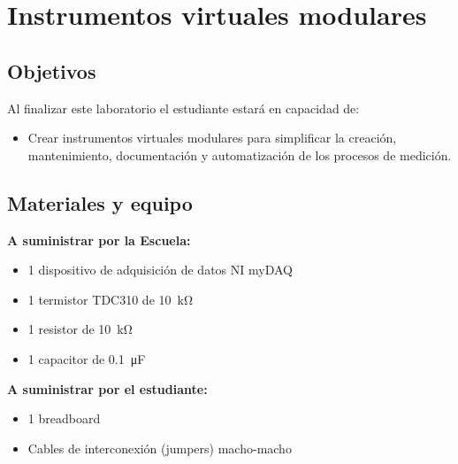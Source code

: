 \documentclass[12pt,letterpaper]{report}
\newcommand{\obj}{Objetivos}
\newcommand{\mat}{Materiales y equipo}
\newcommand{\capacidad}{Al finalizar este laboratorio el estudiante estará en capacidad de:}
\begin{document}
\chapter{Instrumentos virtuales modulares}
\section{\obj}
\capacidad
\begin{itemize}
\item Crear instrumentos virtuales modulares para simplificar la creación, mantenimiento, documentación y automatización de los procesos de medición.
\end{itemize}

\section{\mat}
\textbf{A suministrar por la Escuela:}
\begin{itemize}
\item 1 dispositivo de adquisición de datos NI myDAQ
\item 1 termistor TDC310 de \SI{10}{\kilo\ohm} 
\item 1 resistor de \SI{10}{\kilo\ohm}
\item 1 capacitor de \SI{0.1}{\micro\farad}

\end{itemize}
\textbf{A suministrar por el estudiante:}
\begin{itemize}
\item 1 breadboard
\item Cables de interconexión (jumpers) macho-macho
\end{itemize}
\end{document}
